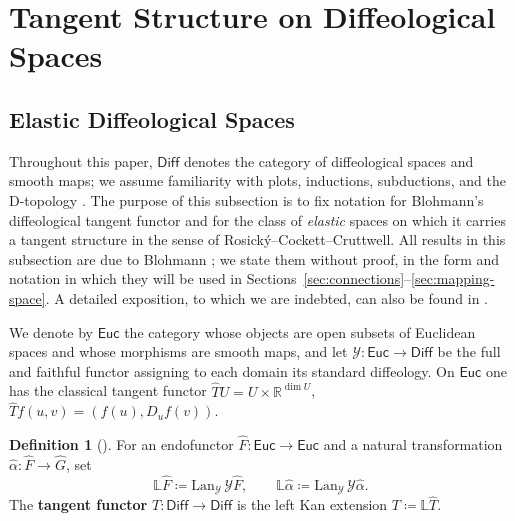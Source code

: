 \documentclass{amsart}
\newcommand{\R}{\mathbb{R}}
\theoremstyle{definition}
\newtheorem{defn}[thm]{Definition}
\begin{document}
 
\section{Tangent Structure on Diffeological Spaces}\label{sec:tangent-structure}

\subsection{Elastic Diffeological Spaces}

Throughout this paper, $\mathsf{Diff}$ denotes the category of diffeological spaces and
smooth maps; we assume familiarity with plots, inductions, subductions, and the
D-topology \cite{PIZ12}. The purpose of this subsection is to fix notation for
Blohmann's diffeological tangent functor and for the class of \emph{elastic}
spaces on which it carries a tangent structure in the sense of
Rosick\'y--Cockett--Cruttwell. All results in this subsection are due to Blohmann
\cite{B23,B24}; we state them without proof, in the form and notation in which
they will be used in Sections~\ref{sec:connections}--\ref{sec:mapping-space}.
A detailed exposition, to which we are indebted, can also be found in
\cite[Section~2.1]{M}.

We denote by $\mathsf{Euc}$ the category whose objects are open subsets of
Euclidean spaces and whose morphisms are smooth maps, and let
$\mathcal{Y}\colon \mathsf{Euc} \to \mathsf{Diff}$ be the full and faithful
functor assigning to each domain its standard diffeology. On $\mathsf{Euc}$ one
has the classical tangent functor
$\hat{T}U = U \times \R^{\dim U}$,
$\hat{T}f(u,v) = (f(u), D_uf(v))$.

\begin{defn}[{\cite[Section~4.1]{B23}}]\label{def:tangent-functor}
For an endofunctor $\hat{F}\colon \mathsf{Euc} \to \mathsf{Euc}$ and a natural
transformation $\hat{\alpha}\colon \hat{F} \to \hat{G}$, set
\begin{equation*}
  \mathbb{L}\hat{F} \coloneqq \mathrm{Lan}_{\mathcal{Y}}\,\mathcal{Y}\hat{F},
  \qquad
  \mathbb{L}\hat{\alpha} \coloneqq
  \mathrm{Lan}_{\mathcal{Y}}\,\mathcal{Y}\hat{\alpha}.
\end{equation*}
The \textbf{tangent functor} $T \colon \mathsf{Diff} \to \mathsf{Diff}$ is the
left Kan extension $T \coloneqq \mathbb{L}\hat{T}$.
\end{defn}
\end{document}
